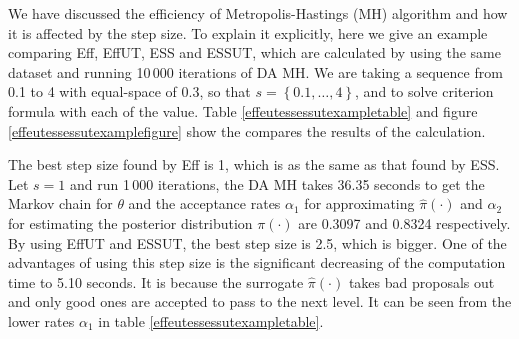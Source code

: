 We have discussed the efficiency of Metropolis-Hastings (MH) algorithm and how it is affected by the step size. To explain it explicitly, here we give an example comparing Eff, EffUT, ESS and ESSUT, which are calculated by using the same dataset and running 10\,000 iterations of DA MH. We are taking a sequence from 0.1 to 4 with equal-space of 0.3, so that $s=\left\lbrace 0.1,\dots,4\right\rbrace$, and to solve criterion formula with each of the value. Table \ref{effeutessessutexampletable} and figure \ref{effeutessessutexamplefigure} show the compares the results of the calculation. 

The best step size found by Eff is 1, which is as the same as that found by ESS. Let $s=1$ and run 1\,000 iterations, the DA MH takes 36.35 seconds to get the Markov chain for $\theta$ and the acceptance rates $\alpha_1$ for approximating $\hat{\pi}(\cdot)$ and $\alpha_2$ for estimating the posterior distribution $\pi(\cdot)$ are 0.3097 and 0.8324 respectively. By using EffUT and ESSUT, the best step size is 2.5, which is bigger. One of the advantages of using this step size is the significant decreasing of the computation time to 5.10 seconds. It is because the surrogate $\hat{\pi}(\cdot)$ takes bad proposals out and only good ones are accepted to pass to the next level. It can be seen from the lower rates $\alpha_1$ in table \ref{effeutessessutexampletable}. 
